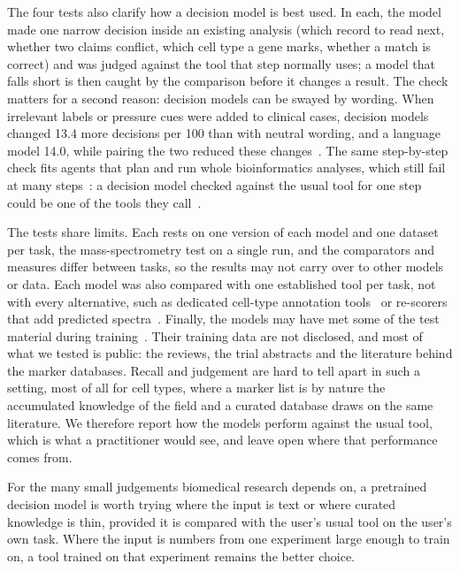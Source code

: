 \documentclass[10pt,twocolumn]{article}
\begin{document}
The four tests also clarify how a decision model is best used. In each, the model made one narrow decision inside an existing analysis (which record to read next, whether two claims conflict, which cell type a gene marks, whether a match is correct) and was judged against the tool that step normally uses; a model that falls short is then caught by the comparison before it changes a result. The check matters for a second reason: decision models can be swayed by wording. When irrelevant labels or pressure cues were added to clinical cases, decision models changed 13.4 more decisions per 100 than with neutral wording, and a language model 14.0, while pairing the two reduced these changes~\cite{omar2026}. The same step-by-step check fits agents that plan and run whole bioinformatics analyses, which still fail at many steps~\cite{omicsbench}: a decision model checked against the usual tool for one step could be one of the tools they call~\cite{drugcoding}.

The tests share limits. Each rests on one version of each model and one dataset per task, the mass-spectrometry test on a single run, and the comparators and measures differ between tasks, so the results may not carry over to other models or data. Each model was also compared with one established tool per task, not with every alternative, such as dedicated cell-type annotation tools~\cite{sctype} or re-scorers that add predicted spectra~\cite{prosit,ms2rescore}. Finally, the models may have met some of the test material during training~\cite{sainz}. Their training data are not disclosed, and most of what we tested is public: the reviews, the trial abstracts and the literature behind the marker databases. Recall and judgement are hard to tell apart in such a setting, most of all for cell types, where a marker list is by nature the accumulated knowledge of the field and a curated database draws on the same literature. We therefore report how the models perform against the usual tool, which is what a practitioner would see, and leave open where that performance comes from.

For the many small judgements biomedical research depends on, a pretrained decision model is worth trying where the input is text or where curated knowledge is thin, provided it is compared with the user's usual tool on the user's own task. Where the input is numbers from one experiment large enough to train on, a tool trained on that experiment remains the better choice.


\end{document}
